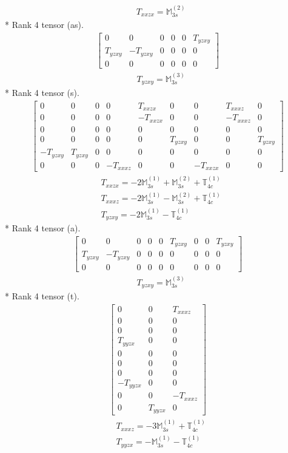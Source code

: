 \documentclass[fleqn,8pt,landscape]{jsarticle}
\begin{document}
\begin{align*}
& T_{xxzx} = \mathbb{M}_{3s}^{(2)}
\end{align*}
* Rank 4 tensor (as).
\begin{align*}
\begin{bmatrix} 0 & 0 & 0 & 0 & 0 & T_{yzxy} \\ T_{yzxy} & - T_{yzxy} & 0 & 0 & 0 & 0 \\ 0 & 0 & 0 & 0 & 0 & 0 \end{bmatrix}
\end{align*}
\begin{align*}
& T_{yzxy} = \mathbb{M}_{3s}^{(3)}
\end{align*}
* Rank 4 tensor (s).
\begin{align*}
\begin{bmatrix} 0 & 0 & 0 & 0 & T_{xxzx} & 0 & 0 & T_{xxxz} & 0 \\ 0 & 0 & 0 & 0 & - T_{xxzx} & 0 & 0 & - T_{xxxz} & 0 \\ 0 & 0 & 0 & 0 & 0 & 0 & 0 & 0 & 0 \\ 0 & 0 & 0 & 0 & 0 & T_{yzxy} & 0 & 0 & T_{yzxy} \\ - T_{yzxy} & T_{yzxy} & 0 & 0 & 0 & 0 & 0 & 0 & 0 \\ 0 & 0 & 0 & - T_{xxxz} & 0 & 0 & - T_{xxzx} & 0 & 0 \end{bmatrix}
\end{align*}
\begin{align*}
& T_{xxzx} = - 2 \mathbb{M}_{3s}^{(1)} + \mathbb{M}_{3s}^{(2)} + \mathbb{T}_{4c}^{(1)} \\
& T_{xxxz} = - 2 \mathbb{M}_{3s}^{(1)} - \mathbb{M}_{3s}^{(2)} + \mathbb{T}_{4c}^{(1)} \\
& T_{yzxy} = - 2 \mathbb{M}_{3s}^{(1)} - \mathbb{T}_{4c}^{(1)}
\end{align*}
* Rank 4 tensor (a).
\begin{align*}
\begin{bmatrix} 0 & 0 & 0 & 0 & 0 & T_{yzxy} & 0 & 0 & T_{yzxy} \\ T_{yzxy} & - T_{yzxy} & 0 & 0 & 0 & 0 & 0 & 0 & 0 \\ 0 & 0 & 0 & 0 & 0 & 0 & 0 & 0 & 0 \end{bmatrix}
\end{align*}
\begin{align*}
& T_{yzxy} = \mathbb{M}_{3s}^{(3)}
\end{align*}
* Rank 4 tensor (t).
\begin{align*}
\begin{bmatrix} 0 & 0 & T_{xxxz} \\ 0 & 0 & 0 \\ 0 & 0 & 0 \\ T_{yyzx} & 0 & 0 \\ 0 & 0 & 0 \\ 0 & 0 & 0 \\ 0 & 0 & 0 \\ - T_{yyzx} & 0 & 0 \\ 0 & 0 & - T_{xxxz} \\ 0 & T_{yyzx} & 0 \end{bmatrix}
\end{align*}
\begin{align*}
& T_{xxxz} = - 3 \mathbb{M}_{3s}^{(1)} + \mathbb{T}_{4c}^{(1)} \\
& T_{yyzx} = - \mathbb{M}_{3s}^{(1)} - \mathbb{T}_{4c}^{(1)}
\end{align*}
\end{document}
